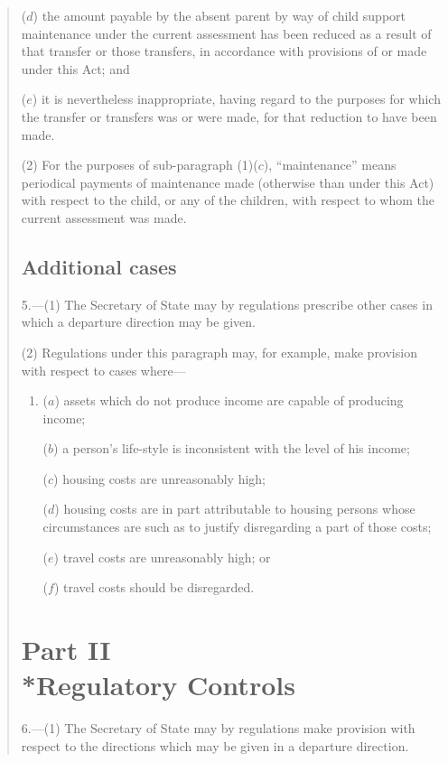\documentclass[a4paper]{article}
\begin{document}
{\begin{quotation}
\begin{enumerate}
($d$) the amount payable by the absent parent by way of child support maintenance under the current assessment has been reduced as a result of that transfer or those transfers, in accordance with provisions of or made under this Act; and

($e$) it is nevertheless inappropriate, having regard to the purposes for which the transfer or transfers was or were made, for that reduction to have been made.
\end{enumerate}

(2) For the purposes of sub-paragraph (1)($c$), “maintenance” means periodical payments of maintenance made (otherwise than under this Act) with respect to the child, or any of the children, with respect to whom the current assessment was made.

\subsection*{Additional cases}

5.---(1) The Secretary of State may by regulations prescribe other cases in which a departure direction may be given.

(2) Regulations under this paragraph may, for example, make provision with respect to cases where—
\begin{enumerate}\item[]
($a$) assets which do not produce income are capable of producing income;

($b$) a person’s life-style is inconsistent with the level of his income;

($c$) housing costs are unreasonably high;

($d$) housing costs are in part attributable to housing persons whose circumstances are such as to justify disregarding a part of those costs;

($e$) travel costs are unreasonably high; or

($f$) travel costs should be disregarded.
\end{enumerate}

\section*{Part II\\*Regulatory Controls}

6.---(1) The Secretary of State may by regulations make provision with respect to the directions which may be given in a departure direction.


\end{quotation}}
\end{document}
